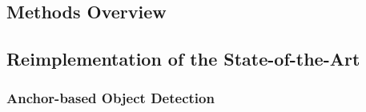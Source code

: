\subsection{Methods Overview}



\subsection{Reimplementation of the State-of-the-Art}

\subsubsection{Anchor-based Object Detection}



